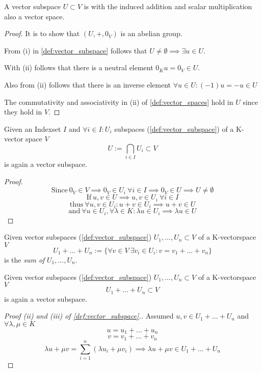 \begin{theorem}[Subspace = Vector Space]\label{thm:subspace=vecspace}
   A vector subspace \(U \subset V\) is with the induced addition and scalar multiplication also a vector space.
\end{theorem}
\begin{proof}
   It is to show that \((U, +, 0_V)\) is an abelian group.

   From (i) in \cref{def:vector_subspace} follows that \(U \neq \emptyset \implies \exists u \in U\).

   With (ii) follows that there is a neutral element \(0_K u = 0_V \in U\).

   Also from (ii) follows that there is an inverse element \(\forall u \in U: (-1)u = -u \in U\)

   The commutativity and associativity in (ii) of \cref{def:vector_spaces} hold in \(U\) since they hold in \(V\).
\end{proof}

\begin{proposition}
   Given an Indexset \(I\) and \(\forall i \in I: U_i\) subspaces (\ref{def:vector_subspace}) of a K-vector space \(V\)
   \[U := \bigcap_{i \in I} U_i \subset V\]
   is again a vector subspace.
\end{proposition}
\begin{proof}
   \[\text{Since}~0_V \in V \implies 0_V \in U_i~\forall i \in I \implies 0_V \in U \implies U \neq \emptyset\]
   \[\text{If}~u, v \in U \implies u, v \in U_i~\forall i \in I\]
   \[\text{thus}~\forall u, v \in U_i: u + v \in U_i \implies u + v \in U\]
   \[\text{and}~\forall u \in U_i, \forall \lambda \in K: \lambda u \in U_i \implies \lambda u \in U\]
\end{proof}

\begin{definition}\label{def:subspace_sum}
   Given vector subspaces (\ref{def:vector_subspace}) \(U_1, \ldots, U_n \subset V\) of a K-vectorspace \(V\)
   \[U_1 + \ldots + U_n := \{\forall v \in V~\exists v_i \in U_i: v = v_1 + \ldots + v_n\}\]
   is the \textit{sum of} \(U_1, \ldots, U_n\).
\end{definition}

\newpage

\begin{theorem}[Summed Subspaces = Subspace]
   Given vector subspaces (\ref{def:vector_subspace}) \(U_1, \ldots, U_n \subset V\) of a K-vectorspace \(V\)
   \[U_1 + \ldots + U_n \subset V\]
   is again a vector subspace.
\end{theorem}
\begin{proof}[Proof (ii) and (iii) of \cref{def:vector_subspace}.]
   Assumed \(u, v \in U_1 + \ldots + U_n\) and \(\forall \lambda, \mu \in K\)
   \[u = u_1 + \ldots + u_n\]
   \[v = v_1 + \ldots + v_n\]
   \[\lambda u + \mu v = \sum_{i=1}^n (\lambda u_i + \mu v_i) \implies \lambda u + \mu v \in U_1 + \ldots + U_n\]
\end{proof}

